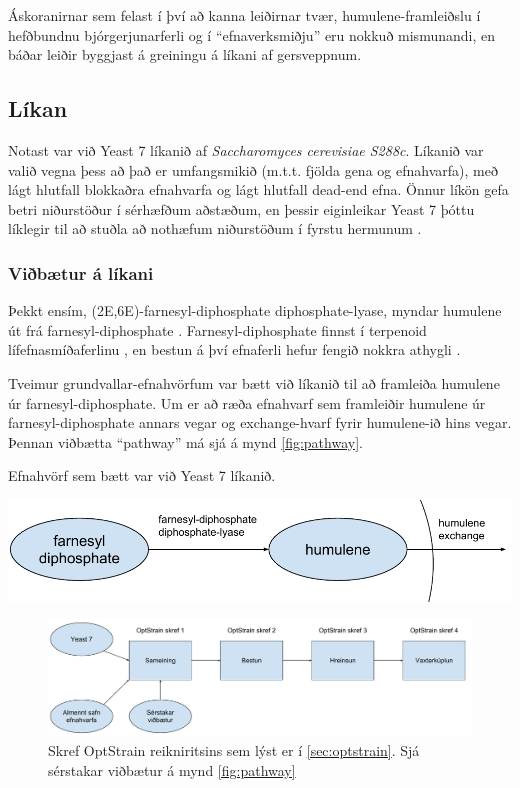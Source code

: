 \documentclass[11pt]{article}
\makeatletter
\newenvironment{figureonecolumn}{\begin{minipage}{\linewidth}\begin{center}\def\@captype{figure}}{\end{center}\end{minipage}}
\makeatother
\begin{document}
\begin{multicols}{2}
Áskoranirnar sem felast í því að kanna leiðirnar tvær, humulene-framleiðslu í hefðbundnu bjórgerjunarferli og í ``efnaverksmiðju'' eru nokkuð mismunandi, en báðar leiðir byggjast á greiningu á líkani af gersveppnum.
\subsection{Líkan}
Notast var við Yeast 7 líkanið\cite{yeastsf} af \emph{Saccharomyces cerevisiae S288c}. Líkanið var valið vegna þess að það er umfangsmikið (m.t.t. fjölda gena og efnahvarfa), með lágt hlutfall blokkaðra efnahvarfa og lágt hlutfall dead-end efna. Önnur líkön gefa betri niðurstöður í sérhæfðum aðstæðum, en þessir eiginleikar Yeast 7 þóttu líklegir til að stuðla að nothæfum niðurstöðum í fyrstu hermunum \cite{heavner2015comparative}. 
\subsubsection{Viðbætur á líkani}
Þekkt ensím, (2E,6E)-farnesyl-diphosphate diphosphate-lyase, myndar humulene út frá farnesyl-diphosphate \cite[KEGG: R08373]{Kanehisa01012000}. Farnesyl-diphosphate finnst í terpenoid lífefnasmíðaferlinu \cite[KEGG: rn00900]{Kanehisa01012000}, en bestun á því efnaferli hefur fengið nokkra athygli \cite{BIT:BIT21216,misawa2011pathway,asadollahi2008production}.

Tveimur grundvallar-efnahvörfum var bætt við líkanið til að framleiða humulene úr farnesyl-diphosphate.
Um er að ræða efnahvarf sem framleiðir humulene úr farnesyl-diphosphate annars vegar og exchange-hvarf fyrir humulene-ið hins vegar. Þennan viðbætta ``pathway'' má sjá á mynd \ref{fig:pathway}.

\begin{figureonecolumn}
\caption[Viðbætur við Yeast 7]{Efnahvörf sem bætt var við Yeast 7 líkanið.}
\label{fig:pathway}
\includegraphics[width=\linewidth]{Pics/HumuleneAddition}
\end{figureonecolumn}
\begin{figure}[b]
\caption[OptStrain reikniritið]{Skref OptStrain reikniritsins sem lýst er í \ref{sec:optstrain}. Sjá sérstakar viðbætur á mynd \ref{fig:pathway}}
\label{fig:flaedirit}
\includegraphics[width=\linewidth]{Pics/OptStrainOverview}
\end{figure}

\end{multicols}
\end{document}
